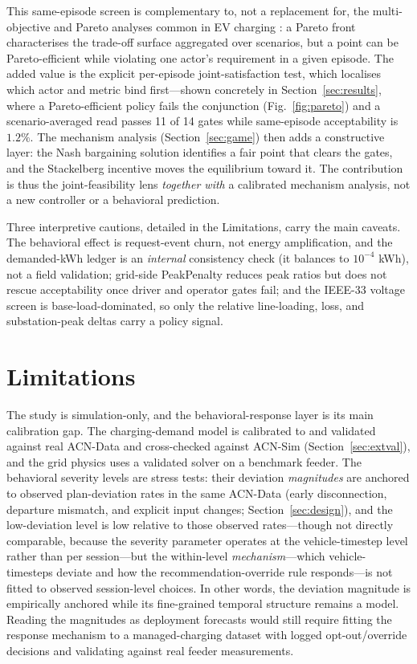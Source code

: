 \documentclass[12pt]{article}
\newcommand{\figref}[1]{Fig.~\ref{#1}}
\begin{document}
This same-episode screen is complementary to, not a replacement for, the multi-objective and Pareto analyses common in EV charging \cite{wang2024multiobj,das2020technoecon,woo2021}: a Pareto front characterises the trade-off surface aggregated over scenarios, but a point can be Pareto-efficient while violating one actor's requirement in a given episode. The added value is the explicit per-episode joint-satisfaction test, which localises which actor and metric bind first---shown concretely in Section~\ref{sec:results}, where a Pareto-efficient policy fails the conjunction (\figref{fig:pareto}) and a scenario-averaged read passes 11 of 14 gates while same-episode acceptability is $1.2\%$. The mechanism analysis (Section~\ref{sec:game}) then adds a constructive layer: the Nash bargaining solution identifies a fair point that clears the gates, and the Stackelberg incentive moves the equilibrium toward it. The contribution is thus the joint-feasibility lens \emph{together with} a calibrated mechanism analysis, not a new controller or a behavioral prediction.

Three interpretive cautions, detailed in the Limitations, carry the main caveats. The behavioral effect is request-event churn, not energy amplification, and the demanded-kWh ledger is an \emph{internal} consistency check (it balances to $10^{-4}$ kWh), not a field validation; grid-side PeakPenalty reduces peak ratios but does not rescue acceptability once driver and operator gates fail; and the IEEE-33 voltage screen is base-load-dominated, so only the relative line-loading, loss, and substation-peak deltas carry a policy signal.

\section{Limitations}\label{sec:limitations}

The study is simulation-only, and the behavioral-response layer is its main calibration gap. The charging-demand model is calibrated to and validated against real ACN-Data and cross-checked against ACN-Sim (Section~\ref{sec:extval}), and the grid physics uses a validated solver on a benchmark feeder. The behavioral severity levels are stress tests: their deviation \emph{magnitudes} are anchored to observed plan-deviation rates in the same ACN-Data (early disconnection, departure mismatch, and explicit input changes; Section~\ref{sec:design}), and the low-deviation level is low relative to those observed rates---though not directly comparable, because the severity parameter operates at the vehicle-timestep level rather than per session---but the within-level \emph{mechanism}---which vehicle-timesteps deviate and how the recommendation-override rule responds---is not fitted to observed session-level choices. In other words, the deviation magnitude is empirically anchored while its fine-grained temporal structure remains a model. Reading the magnitudes as deployment forecasts would still require fitting the response mechanism to a managed-charging dataset with logged opt-out/override decisions and validating against real feeder measurements.
\end{document}
